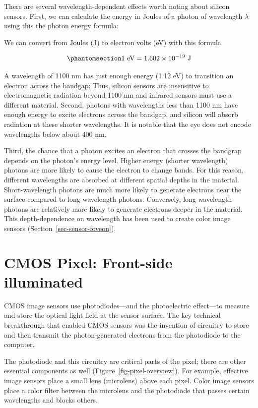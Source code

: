 \documentclass[
  letterpaper,
]{book}
\begin{document}
There are several wavelength-dependent effects worth noting about
silicon sensors. First, we can calculate the energy in Joules of a
photon of wavelength \(\lambda\) using this the photon energy formula:

We can convert from Joules (J) to electron volts (eV) with this formula

\begin{equation}\phantomsection\label{eq-joules-ev}{
1~\text{eV} = {1.602 \times 10^{-19}}~\text{J} 
}\end{equation}

A wavelength of 1100 nm has just enough energy (1.12 eV) to transition
an electron across the bandgap: Thus, silicon sensors are insensitive to
electromagnetic radiation beyond 1100 nm and infrared sensors must use a
different material. Second, photons with wavelengths less than 1100 nm
have enough energy to excite electrons across the bandgap, and silicon
will absorb radiation at these shorter wavelengths. It is notable that
the eye does not encode wavelengths below about 400 nm.

Third, the chance that a photon excites an electron that crosses the
bandgrap depends on the photon's energy level. Higher energy (shorter
wavelength) photons are more likely to cause the electron to change
bands. For this reason, different wavelengths are absorbed at different
spatial depths in the material. Short-wavelength photons are much more
likely to generate electrons near the surface compared to
long-wavelength photons. Conversely, long-wavelength photons are
relatively more likely to generate electrons deeper in the material.
This depth-dependence on wavelength has been used to create color image
sensors (Section~\ref{sec-sensor-foveon}).

\section{CMOS Pixel: Front-side illuminated}\label{sec-cmos-pixel-fsi}

CMOS image sensors use photodiodes---and the photoelectric effect---to
measure and store the optical light field at the sensor surface. The key
technical breakthrough that enabled CMOS sensors was the invention of
circuitry to store and then transmit the photon-generated electrons from
the photodiode to the computer.

The photodiode and this circuitry are critical parts of the pixel; there
are other essential components as well
(Figure~\ref{fig-pixel-overview}). For example, effective image sensors
place a small lens (microlens) above each pixel. Color image sensors
place a color filter between the microlens and the photodiode that
passes certain wavelengths and blocks others.
\end{document}
